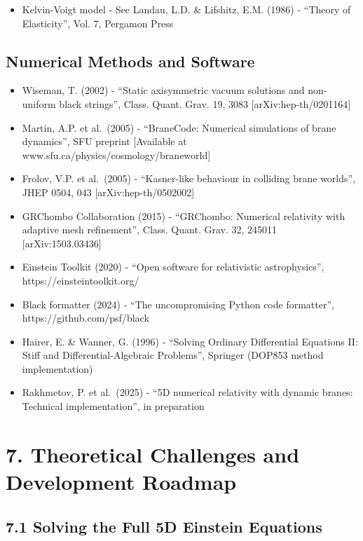 \documentclass[
  11pt,
]{report}
\providecommand{\tightlist}{%
  \setlength{\itemsep}{0pt}\setlength{\parskip}{0pt}}
\begin{document}
\begin{itemize}
\tightlist
\item
  Kelvin-Voigt model - See Landau, L.D. \& Lifshitz, E.M. (1986) -
  ``Theory of Elasticity'', Vol. 7, Pergamon Press
\end{itemize}

\subsection{Numerical Methods and
Software}\label{numerical-methods-and-software}

\begin{itemize}
\tightlist
\item
  Wiseman, T. (2002) - ``Static axisymmetric vacuum solutions and
  non-uniform black strings'', Class. Quant. Grav. 19, 3083
  {[}arXiv:hep-th/0201164{]}
\item
  Martin, A.P. et al.~(2005) - ``BraneCode: Numerical simulations of
  brane dynamics'', SFU preprint {[}Available at
  www.sfu.ca/physics/cosmology/braneworld{]}
\item
  Frolov, V.P. et al.~(2005) - ``Kasner-like behaviour in colliding
  brane worlds'', JHEP 0504, 043 {[}arXiv:hep-th/0502002{]}
\item
  GRChombo Collaboration (2015) - ``GRChombo: Numerical relativity with
  adaptive mesh refinement'', Class. Quant. Grav. 32, 245011
  {[}arXiv:1503.03436{]}
\item
  Einstein Toolkit (2020) - ``Open software for relativistic
  astrophysics'', https://einsteintoolkit.org/
\item
  Black formatter (2024) - ``The uncompromising Python code formatter'',
  https://github.com/psf/black
\item
  Hairer, E. \& Wanner, G. (1996) - ``Solving Ordinary Differential
  Equations II: Stiff and Differential-Algebraic Problems'', Springer
  (DOP853 method implementation)
\item
  Rakhmetov, P. et al.~(2025) - ``5D numerical relativity with dynamic
  branes: Technical implementation'', in preparation
\end{itemize}

\section{7. Theoretical Challenges and Development
Roadmap}\label{theoretical-challenges-and-development-roadmap}

\subsection{7.1 Solving the Full 5D Einstein
Equations}\label{solving-the-full-5d-einstein-equations}
\end{document}
